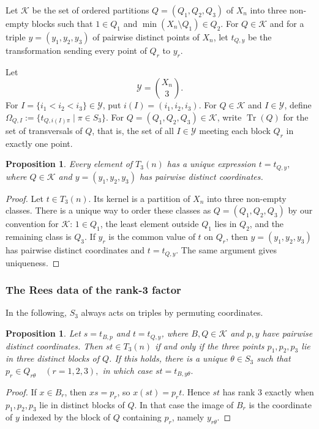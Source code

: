 \documentclass[11pt]{article}
\theoremstyle{plain}
\newtheorem{prop}[theorem]{Proposition}
\theoremstyle{remark}
\theoremstyle{definition}
\theoremstyle{plain}
\DeclareMathOperator{\Tr}{Tr}
\begin{document}
Let $\mathcal K$ be the set of ordered partitions
 $Q=(Q_1,Q_2,Q_3)$
of $X_n$ into three non-empty blocks such that
 $1\in Q_1$ and 
        $\min(X_n\setminus Q_1)\in Q_2$.
For $Q\in\mathcal K$ and for a triple $y=(y_1,y_2,y_3)$ of pairwise distinct
points of $X_n$, let $t_{Q,y}$ be the transformation sending every point of
$Q_r$ to $y_r$.

Let
\[
        \mathcal Y=\binom{X_n}{3}.
\]
For $I=\{i_1<i_2<i_3\}\in\mathcal Y$, put
\(i(I)=(i_1,i_2,i_3).\)
For $Q\in\mathcal K$ and $I\in\mathcal Y$, define
\(\Omega_{Q,I}:=\{t_{Q,i(I)\pi}\mid\pi\in S_3\}.\)
For $Q=(Q_1,Q_2,Q_3)\in\mathcal K$, write $\Tr(Q)$ for the set of transversals
of $Q$, that is, the set of all $I\in\mathcal Y$ meeting each block $Q_r$ in
exactly one point.

\begin{prop}\label{t3:prop:canonical}
Every element of $T_3(n)$ has a unique expression
\(t=t_{Q,y},\)
where $Q\in\mathcal K$ and $y=(y_1,y_2,y_3)$ has pairwise distinct coordinates.
\end{prop}

\begin{proof}
Let $t\in T_3(n)$. Its kernel is a partition of $X_n$ into three non-empty
classes. There is a unique way to order these classes as $Q=(Q_1,Q_2,Q_3)$ by
our convention for $\mathcal K$: $1\in Q_1$, the least element outside $Q_1$ lies in $Q_2$, and
the remaining class is $Q_3$. If $y_r$ is the common value of $t$ on $Q_r$, then
$y=(y_1,y_2,y_3)$ has pairwise distinct coordinates and $t=t_{Q,y}$. The same
argument gives uniqueness.
\end{proof}

\subsubsection[The Rees data of the rank-3 factor]{The Rees data of the rank-3 factor}
In the following, $S_3$ always acts on triples by permuting coordinates.

\begin{prop}\label{t3:prop:product-rule}
Let $s=t_{B,p}$ and $t=t_{Q,y}$, where $B,Q\in\mathcal K$ and $p,y$ have
pairwise distinct coordinates. Then $st\in T_3(n)$ if and only if the three
points $p_1,p_2,p_3$ lie in three distinct blocks of $Q$. If this holds, there
is a unique $\theta\in S_3$ such that
\(p_r\in Q_{r\theta}\quad(r=1,2,3),\)
in which case
\(st=t_{B,y\theta}.\)
\end{prop}

\begin{proof}
If $x\in B_r$, then $xs=p_r$, so $x(st)=p_rt$. Hence $st$ has rank 3
exactly when $p_1,p_2,p_3$ lie in distinct blocks of $Q$. In that case the
image of $B_r$ is the coordinate of $y$ indexed by the block of $Q$ containing
$p_r$, namely $y_{r\theta}$.
\end{proof}
\end{document}
